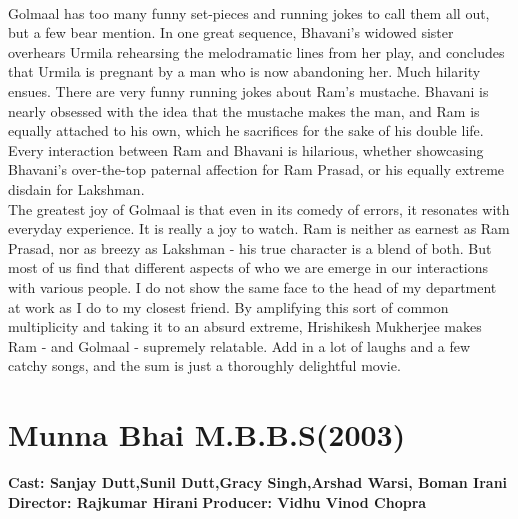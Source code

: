 \documentclass{article}
\begin{document}
\\
Golmaal has too many funny set-pieces and running jokes to call them all out, but a few bear mention.  In one great sequence, Bhavani's widowed sister overhears Urmila rehearsing the melodramatic lines from her play, and concludes that Urmila is pregnant by a man who is now abandoning her.  Much hilarity ensues.  There are very funny running jokes about Ram's mustache.  Bhavani is nearly obsessed with the idea that the mustache makes the man, and Ram is equally attached to his own, which he sacrifices for the sake of his double life.  Every interaction between Ram and Bhavani is hilarious, whether showcasing Bhavani's over-the-top paternal affection for Ram Prasad, or his equally extreme disdain for Lakshman. 
\\
The greatest joy of Golmaal is that even in its comedy of errors, it resonates with everyday experience. It is really a joy to watch.  Ram is neither as earnest as Ram Prasad, nor as breezy as Lakshman - his true character is a blend of both.  But most of us find that different aspects of who we are emerge in our interactions with various people.  I do not show the same face to the head of my department at work as I do to my closest friend.  By amplifying this sort of common multiplicity and taking it to an absurd extreme, Hrishikesh Mukherjee makes Ram - and Golmaal - supremely relatable.  Add in a lot of laughs and a few catchy songs, and the sum is just a thoroughly delightful movie. 


\section{Munna Bhai M.B.B.S(2003)}

\textbf{Cast: Sanjay Dutt,Sunil Dutt,Gracy Singh,Arshad Warsi, Boman Irani}
\textbf{Director: Rajkumar Hirani }  
\textbf{Producer: Vidhu Vinod Chopra }
\end{document}
